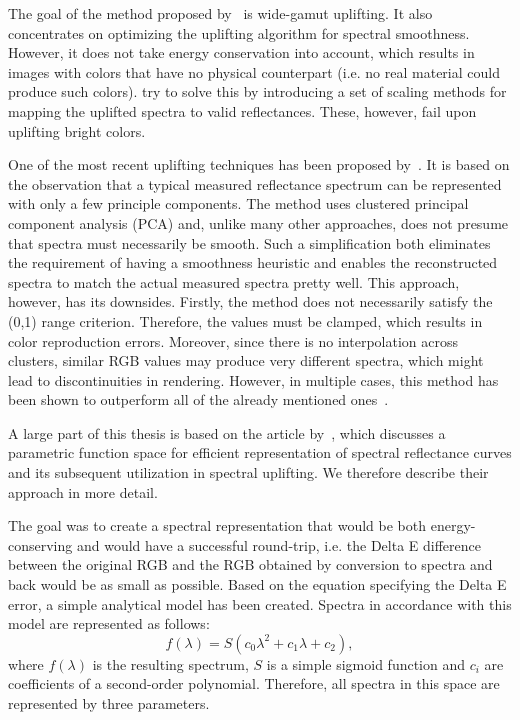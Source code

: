 The goal of the method proposed by~\citet{upsamplingMeng} is wide-gamut uplifting. It also concentrates on optimizing the uplifting algorithm for spectral smoothness. However, it does not take energy conservation into account, which results in images with colors that have no physical counterpart (i.e. no real material could produce such colors). \citet{upsamplingMeng} try to solve this by introducing a set of scaling methods for mapping the uplifted spectra to valid reflectances. These, however, fail upon uplifting bright colors. 

One of the most recent uplifting techniques has been proposed by~\citet{upsamplingOtsu}. It is based on the observation that a typical measured reflectance spectrum can be represented with only a few principle components. The method uses clustered principal component analysis (PCA) and, unlike many other approaches, does not presume that spectra must necessarily be smooth. Such a simplification both eliminates the requirement of having a smoothness heuristic and enables the reconstructed spectra to match the actual measured spectra pretty well. This approach, however, has its downsides. Firstly, the method does not necessarily satisfy the (0,1) range criterion. Therefore, the values must be clamped, which results in color reproduction errors. Moreover, since there is no interpolation across clusters, similar RGB values may produce very different spectra, which might lead to discontinuities in rendering. However, in multiple cases, this method has been shown to outperform all of the already mentioned ones~\cite{upsamplingJakobHanika}.

A large part of this thesis is based on the article by~\citet{upsamplingJakobHanika}, which discusses a parametric function space for efficient representation of spectral reflectance curves and its subsequent utilization in spectral uplifting. We therefore describe their approach in more detail.

The goal was to create a spectral representation that would be both energy-conserving and would have a successful round-trip, i.e. the Delta E difference between the original RGB and the RGB obtained by conversion to spectra and back would be as small as possible. Based on the equation specifying the Delta E error, a simple analytical model has been created. Spectra in accordance with this model are represented as follows:
\begin{equation} \label{sigmoidRepresentation}
f(\lambda)=S(c_{0}\lambda^2+c_{1}\lambda+c_{2}),
\end{equation}
where $f(\lambda)$ is the resulting spectrum, $S$ is a simple sigmoid function and $c_{i}$ are coefficients of a second-order polynomial. Therefore, all spectra in this space are represented by three parameters.


